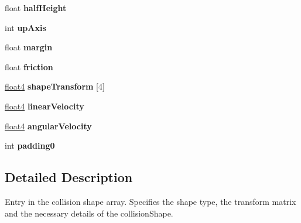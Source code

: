\begin{DoxyCompactItemize}
\item 
\hypertarget{struct_collision_shape_description_ab085d968b0f979648a8d7c971369a7ce}{float {\bfseries half\+Height}}\label{struct_collision_shape_description_ab085d968b0f979648a8d7c971369a7ce}

\item 
\hypertarget{struct_collision_shape_description_aa083993665c25e0bf7dc0409f95a9442}{int {\bfseries up\+Axis}}\label{struct_collision_shape_description_aa083993665c25e0bf7dc0409f95a9442}

\item 
\hypertarget{struct_collision_shape_description_a3c7814f4d6f72a511c16a2567a43f2a8}{float {\bfseries margin}}\label{struct_collision_shape_description_a3c7814f4d6f72a511c16a2567a43f2a8}

\item 
\hypertarget{struct_collision_shape_description_a63828095817a110640e6ed25a5d937f7}{float {\bfseries friction}}\label{struct_collision_shape_description_a63828095817a110640e6ed25a5d937f7}

\item 
\hypertarget{struct_collision_shape_description_a4d60eb62c5a0b3ac26324d0f51891fb0}{\hyperlink{structfloat4}{float4} {\bfseries shape\+Transform} \mbox{[}4\mbox{]}}\label{struct_collision_shape_description_a4d60eb62c5a0b3ac26324d0f51891fb0}

\item 
\hypertarget{struct_collision_shape_description_ac53b422f59e73501ce9bde7f87a96be5}{\hyperlink{structfloat4}{float4} {\bfseries linear\+Velocity}}\label{struct_collision_shape_description_ac53b422f59e73501ce9bde7f87a96be5}

\item 
\hypertarget{struct_collision_shape_description_af03b78a96287d84aa35699ee7314ecaf}{\hyperlink{structfloat4}{float4} {\bfseries angular\+Velocity}}\label{struct_collision_shape_description_af03b78a96287d84aa35699ee7314ecaf}

\item 
\hypertarget{struct_collision_shape_description_aa83053e879feca22b1924baaaaf70621}{int {\bfseries padding0}}\label{struct_collision_shape_description_aa83053e879feca22b1924baaaaf70621}

\end{DoxyCompactItemize}


\subsection{Detailed Description}
Entry in the collision shape array. Specifies the shape type, the transform matrix and the necessary details of the collision\+Shape. 

